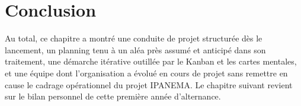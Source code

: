 \section{Conclusion}

Au total, ce chapitre a montré une conduite de projet structurée dès le lancement, un 
planning tenu à un aléa près assumé et anticipé dans son traitement, une démarche itérative 
outillée par le Kanban et les cartes mentales, et une équipe dont l'organisation a évolué en 
cours de projet sans remettre en cause le cadrage opérationnel du projet IPANEMA. Le 
chapitre suivant revient sur le bilan personnel de cette première année d'alternance.
